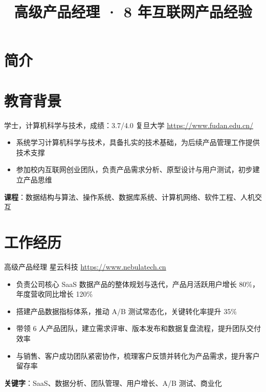 \documentclass[a4paper, serif, 10pt]{moderncv}
\title{高级产品经理 · 8 年互联网产品经验}
\begin{document}
\maketitle

\section{简介}

\section{教育背景}

        {学士，计算机科学与技术，成绩：3.7/4.0}
        {复旦大学}
        {\url{https://www.fudan.edu.cn/}}
        {}
        {\begin{itemize}
\item 系统学习计算机科学与技术，具备扎实的技术基础，为后续产品管理工作提供技术支撑
\item 参加校内互联网创业团队，负责产品需求分析、原型设计与用户测试，初步建立产品思维
\end{itemize}
\textbf{课程}：数据结构与算法、操作系统、数据库系统、计算机网络、软件工程、人机交互}
\section{工作经历}

        {高级产品经理}
        {星云科技}
        {\url{https://www.nebulatech.cn}}
        {}
        {\begin{itemize}
\item 负责公司核心 SaaS 数据产品的整体规划与迭代，产品月活跃用户增长 80\%，年度营收同比增长 120\%
\item 搭建产品数据指标体系，推动 A/B 测试常态化，关键转化率提升 35\%
\item 带领 6 人产品团队，建立需求评审、版本发布和数据复盘流程，提升团队交付效率
\item 与销售、客户成功团队紧密协作，梳理客户反馈并转化为产品需求，提升客户留存率
\end{itemize}
\textbf{关键字}：SaaS、数据分析、团队管理、用户增长、A/B 测试、商业化}
\end{document}
